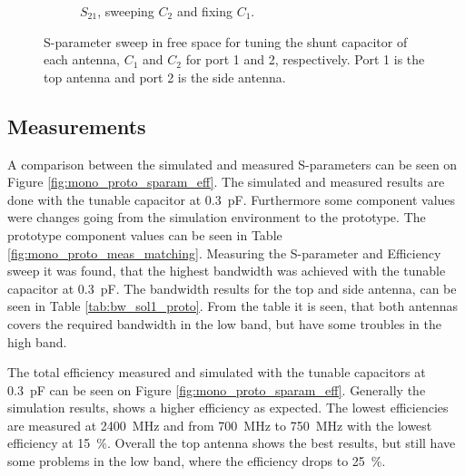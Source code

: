 \begin{figure}[htbp]
\begin{subfigure}[b]{0.49\linewidth}
        \caption{$S_{21}$, sweeping $C_2$ and fixing $C_1$.}
        \label{fig:ant1_proto_sim_s22_s12}
    \end{subfigure}
    \caption{S-parameter sweep in free space for tuning the shunt capacitor of each antenna, $C_1$ and $C_2$ for port 1 and 2, respectively. Port 1 is the top antenna and port 2 is the side antenna.}
    \label{fig:sparam_mono_proto_sim}
\end{figure}

\FloatBarrier
\subsection{Measurements}
A comparison between the simulated and measured S-parameters can be seen on Figure \ref{fig:mono_proto_sparam_eff}. The simulated and measured results are done with the tunable capacitor at \SI{0.3}{pF}. Furthermore some component values were changes going from the simulation environment to the prototype. The prototype component values can be seen in Table \ref{fig:mono_proto_meas_matching}. Measuring the S-parameter and Efficiency sweep it was found, that the highest bandwidth was achieved with the tunable capacitor at \SI{0.3}{pF}. The bandwidth results for the top and side antenna, can be seen in Table \ref{tab:bw_sol1_proto}. From the table it is seen, that both antennas covers the required bandwidth in the low band, but have some troubles in the high band. 

The total efficiency measured and simulated with the tunable capacitors at \SI{0.3}{pF} can be seen on Figure \ref{fig:mono_proto_sparam_eff}. Generally the simulation results, shows a higher efficiency as expected. The lowest efficiencies are measured at \SI{2400}{MHz} and from \SI{700}{MHz} to \SI{750}{MHz} with the lowest efficiency at \SI{15}{\percent}. Overall the top antenna shows the best results, but still have some problems in the low band, where the efficiency drops to \SI{25}{\percent}.

